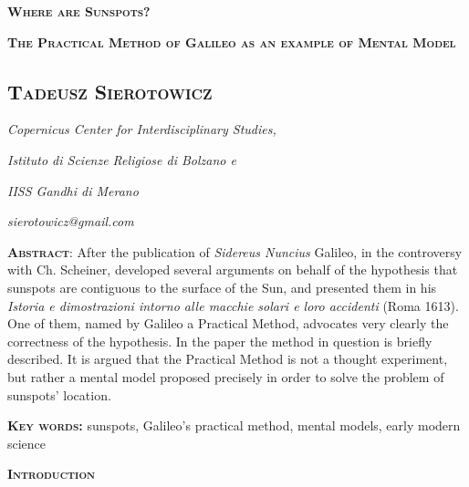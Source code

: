 \documentclass[a4paper]{article}
\title{}
\begin{document}
{\centering\bfseries\scshape
Where are Sunspots? 
\par}

{\centering\bfseries\scshape
The Practical Method of Galileo as an example of Mental Model
\par}

\subsection[Tadeusz Sierotowicz]{\bfseries\scshape Tadeusz Sierotowicz}
{\centering\itshape\color[rgb]{0.15294118,0.14901961,0.15294118}
Copernicus Center for Interdisciplinary Studies,
\par}

{\centering\itshape\color[rgb]{0.15294118,0.14901961,0.15294118}
Istituto di Scienze Religiose di Bolzano e
\par}

{\centering\itshape\color[rgb]{0.15294118,0.14901961,0.15294118}
IISS Gandhi di Merano
\par}

{\centering\itshape\color[rgb]{0.15294118,0.14901961,0.15294118}
sierotowicz@gmail.com
\par}

\textbf{\textsc{Abstract}}: After the publication of \textit{Sidereus Nuncius} Galileo, in the controversy with Ch.
Scheiner, developed several arguments on behalf of the hypothesis that sunspots are contiguous to the surface of the
Sun, and presented them in his\textit{ }\textit{Istoria e dimostrazioni intorno alle macchie solari e loro accidenti}
(Roma 1613). One of them, named by Galileo a Practical Method, advocates very clearly the correctness of the
hypothesis. In the paper the method in question is briefly described. It is argued that the Practical Method is not a
thought experiment, but rather a mental model proposed precisely in order to solve the problem of sunspots’ location. 

\textbf{\textsc{Key words}}\textbf{:} sunspots, Galileo’s practical method, mental models, early modern science

{\centering\bfseries\scshape
Introduction
\par}
\end{document}
